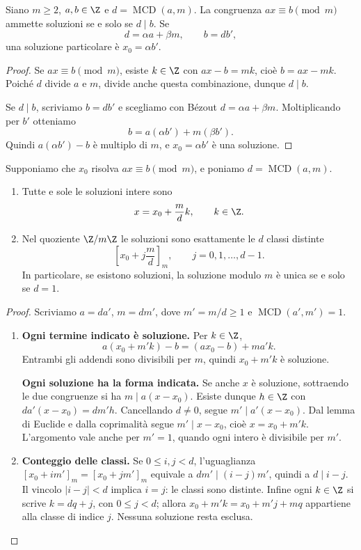 \begin{teorema}\label{teo:congruenza-lineare}
Siano $m\ge2$, $a,b\in\Z$ e $d=\operatorname{MCD}(a,m)$. La congruenza $ax\equiv b\pmod m$ ammette soluzioni se e solo se $d\mid b$. Se
\[
d=\alpha a+\beta m,\qquad b=db',
\]
una soluzione particolare è $x_0=\alpha b'$.
\end{teorema}
\begin{proof}
\passomath{\Rightarrow} Se $ax\equiv b\pmod m$, esiste $k\in\Z$ con $ax-b=mk$, cioè $b=ax-mk$. Poiché $d$ divide $a$ e $m$, divide anche questa combinazione, dunque $d\mid b$.

\passomath{\Leftarrow} Se $d\mid b$, scriviamo $b=db'$ e scegliamo con Bézout $d=\alpha a+\beta m$. Moltiplicando per $b'$ otteniamo
\[
b=a(\alpha b')+m(\beta b').
\]
Quindi $a(\alpha b')-b$ è multiplo di $m$, e $x_0=\alpha b'$ è una soluzione.
\end{proof}

\begin{teorema}\label{teo:tutte-congruenza}
Supponiamo che $x_0$ risolva $ax\equiv b\pmod m$, e poniamo $d=\operatorname{MCD}(a,m)$. \begin{enumerate}[label=\arabic*.]
\item Tutte e sole le soluzioni intere sono
\[
x=x_0+\frac{m}{d}k,\qquad k\in\Z.
\]
\item Nel quoziente $\Z/m\Z$ le soluzioni sono esattamente le $d$ classi distinte
\[
\left[x_0+j\frac{m}{d}\right]_m,\qquad j=0,1,\ldots,d-1.
\]
In particolare, se esistono soluzioni, la soluzione modulo $m$ è unica se e solo se $d=1$.
\end{enumerate}
\end{teorema}
\begin{proof}
Scriviamo $a=da'$, $m=dm'$, dove $m'=m/d\ge1$ e $\operatorname{MCD}(a',m')=1$.

\begin{enumerate}[label=\arabic*.]
\item \textbf{Ogni termine indicato è soluzione.} Per $k\in\Z$,
\[
a(x_0+m'k)-b=(ax_0-b)+ma'k.
\]
Entrambi gli addendi sono divisibili per $m$, quindi $x_0+m'k$ è soluzione.

\textbf{Ogni soluzione ha la forma indicata.} Se anche $x$ è soluzione, sottraendo le due congruenze si ha $m\mid a(x-x_0)$. Esiste dunque $h\in\Z$ con $da'(x-x_0)=dm'h$. Cancellando $d\ne0$, segue $m'\mid a'(x-x_0)$. Dal lemma di Euclide e dalla coprimalità segue $m'\mid x-x_0$, cioè $x=x_0+m'k$. L'argomento vale anche per $m'=1$, quando ogni intero è divisibile per $m'$.
\item \textbf{Conteggio delle classi.} Se $0\le i,j<d$, l'uguaglianza $[x_0+im']_m=[x_0+jm']_m$ equivale a $dm'\mid(i-j)m'$, quindi a $d\mid i-j$. Il vincolo $|i-j|<d$ implica $i=j$: le classi sono distinte. Infine ogni $k\in\Z$ si scrive $k=dq+j$, con $0\le j<d$; allora $x_0+m'k=x_0+m'j+mq$ appartiene alla classe di indice $j$. Nessuna soluzione resta esclusa.
\end{enumerate}
\end{proof}

